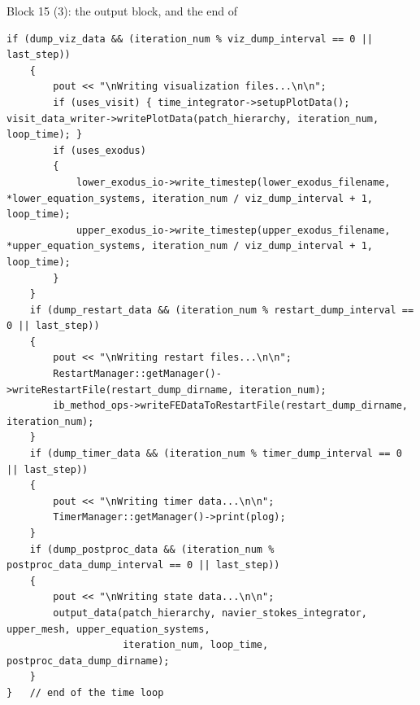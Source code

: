 \documentclass[aspectratio=169,11pt]{beamer}
\begin{document}
\begin{frame}[fragile]{Block 15 (3): the output block, and the end of }
\label{fr:outblock}
\begin{lstlisting}[style=cppmicro]
    if (dump_viz_data && (iteration_num % viz_dump_interval == 0 || last_step))
    {
        pout << "\nWriting visualization files...\n\n";
        if (uses_visit) { time_integrator->setupPlotData(); visit_data_writer->writePlotData(patch_hierarchy, iteration_num, loop_time); }
        if (uses_exodus)
        {
            lower_exodus_io->write_timestep(lower_exodus_filename, *lower_equation_systems, iteration_num / viz_dump_interval + 1, loop_time);
            upper_exodus_io->write_timestep(upper_exodus_filename, *upper_equation_systems, iteration_num / viz_dump_interval + 1, loop_time);
        }
    }
    if (dump_restart_data && (iteration_num % restart_dump_interval == 0 || last_step))
    {
        pout << "\nWriting restart files...\n\n";
        RestartManager::getManager()->writeRestartFile(restart_dump_dirname, iteration_num);
        ib_method_ops->writeFEDataToRestartFile(restart_dump_dirname, iteration_num);
    }
    if (dump_timer_data && (iteration_num % timer_dump_interval == 0 || last_step))
    {
        pout << "\nWriting timer data...\n\n";
        TimerManager::getManager()->print(plog);
    }
    if (dump_postproc_data && (iteration_num % postproc_data_dump_interval == 0 || last_step))
    {
        pout << "\nWriting state data...\n\n";
        output_data(patch_hierarchy, navier_stokes_integrator, upper_mesh, upper_equation_systems,
                    iteration_num, loop_time, postproc_data_dump_dirname);
    }
}   // end of the time loop
\end{lstlisting}
\end{frame}
\end{document}
